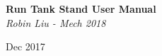 \documentclass[11pt]{article}
\begin{document}
\begin{titlepage}
   \begin{center}
      \Large\textbf{Run Tank Stand User Manual}\\
      \large\textit{Robin Liu - Mech 2018}
      
      Dec 2017
   \end{center}
\end{titlepage}
\end{document}
